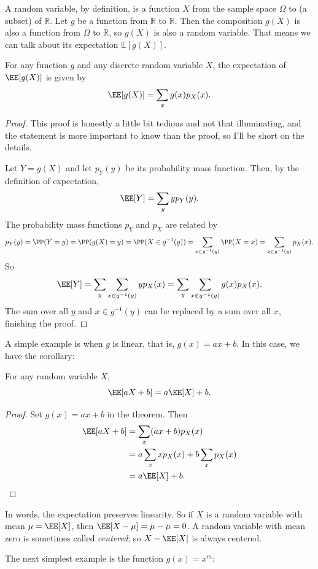 \documentclass{ximera}
\begin{document}
A random variable, by definition, is a function $X$ from the sample space $\Omega$ to (a subset) of $\mathbb{R}$. Let $g$ be a function from $\mathbb{R}$ to $\mathbb{R}$. Then the composition $g(X)$ is also a function from $\Omega$ to $\mathbb{R}$, so $g(X)$ is also a random variable. That means we can talk about its expectation $\mathbb{E}[g(X)]$.

\begin{theorem}\label{gx} For any function $g$ and any discrete random variable $X$, the expectation of $\EE[g(X)]$ is given by $$
\EE[g(X)] = \sum_x g(x) p_X(x).
$$
\end{theorem}
\begin{proof}
This proof is honestly a little bit tedious and not that illuminating, and the statement is more important to know than the proof, so I'll be short on the details.

Let $Y=g(X)$ and let $p_Y(y)$ be its probability mass function. Then, by the definition of expectation,
$$
\EE[Y] = \sum_y y p_Y(y).
$$
The probability mass functions $p_Y$ and $p_X$ are related by
$$
p_Y(y) = \PP( Y=y ) = \PP(g(X) = y) = \PP(X \in g^{-1}(y)) = \sum_{x \in g^{-1}(y)} \PP(X = x) = \sum_{x \in g^{-1}(y)}   p_X(x).
$$
So
$$
\EE[Y] = \sum_y  \sum_{x \in g^{-1}(y)}  y p_X(x) = \sum_y  \sum_{x \in g^{-1}(y)}  g(x) p_X(x).
$$
The sum over all $y$ and $x\in g^{-1}(y)$ can be replaced by a sum over all $x$, finishing the proof.
\end{proof}

A simple example is when $g$ is linear, that is, $g(x)=ax+b$. In this case, we have the corollary:
\begin{corollary}
For any random variable $X$,
$$
\EE[aX+b] = a \EE[X]  + b.
$$
\end{corollary}
\begin{proof}
Set $g(x)=ax+b$ in the theorem. Then
\begin{align*}
\EE[aX+b] &= \sum_x (ax+b)p_X(x) \\
&= a\sum_x xp_X(x) + b\sum_x p_X(x) \\
&= a \EE[X] + b.
\end{align*}
\end{proof}

In words, the expectation preserves linearity. So if $X$ is a random variable with mean $\mu=\EE[X]$, then $\EE[X-\mu] = \mu-\mu=0$. A random variable with mean zero is sometimes called \textit{centered}; so $X-\EE[X]$ is always centered.

The next simplest example is the function $g(x)=x^m$:
\end{document}
